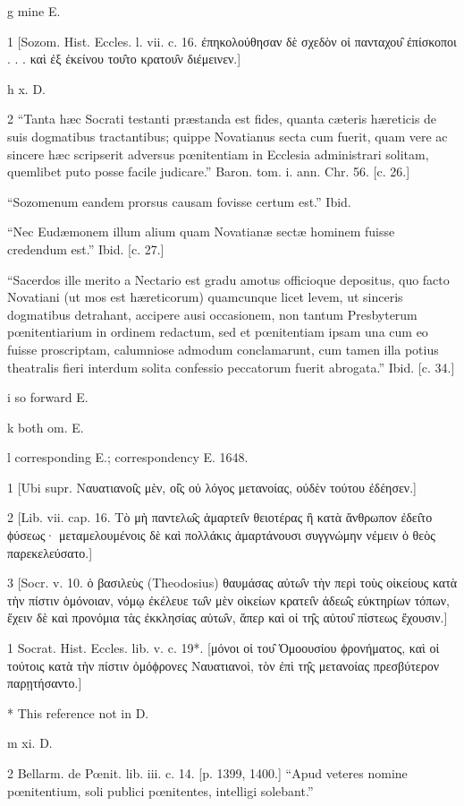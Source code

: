 g
mine E.

1
[Sozom. Hist. Eccles. l. vii. c. 16. ἐπηκολούθησαν δὲ σχεδὸν οἱ πανταχου̑ ἐπίσκοποι . . . καὶ ἐξ ἐκείνου του̑το κρατου̑ν διέμεινεν.]

h
x. D.

2
“Tanta hæc Socrati testanti præstanda est fides, quanta cæteris hæreticis de suis dogmatibus tractantibus; quippe Novatianus secta cum fuerit, quam vere ac sincere hæc scripserit adversus pœnitentiam in Ecclesia administrari solitam, quemlibet puto posse facile judicare.” Baron. tom. i. ann. Chr. 56. [c. 26.]

“Sozomenum eandem prorsus causam fovisse certum est.” Ibid.

“Nec Eudæmonem illum alium quam Novatianæ sectæ hominem fuisse credendum est.” Ibid. [c. 27.]

“Sacerdos ille merito a Nectario est gradu amotus officioque depositus, quo facto Novatiani (ut mos est hæreticorum) quamcunque licet levem, ut sinceris dogmatibus detrahant, accipere ausi occasionem, non tantum Presbyterum pœnitentiarium in ordinem redactum, sed et pœnitentiam ipsam una cum eo fuisse proscriptam, calumniose admodum conclamarunt, cum tamen illa potius theatralis fieri interdum solita confessio peccatorum fuerit abrogata.” Ibid. [c. 34.]

i
so forward E.

k
both om. E.

l
corresponding E.; correspondency E. 1648.

1
[Ubi supr. Ναυατιανοι̑ς μὲν, οἱ̑ς οὐ λόγος μετανοίας, οὐδὲν τούτου ἐδέησεν.]

2
[Lib. vii. cap. 16. Τὸ μὴ παντελω̑ς ἁμαρτει̑ν θειοτέρας ἢ κατὰ ἄνθρωπον ἐδει̑το ϕύσεως· μεταμελουμένοις δὲ καὶ πολλάκις ἁμαρτάνουσι συγγνώμην νέμειν ὁ θεὸς παρεκελεύσατο.]

3
[Socr. v. 10. ὁ βασιλεὺς (Theodosius) θαυμάσας αὐτω̑ν τὴν περὶ τοὺς οἰκείους κατὰ τὴν πίστιν ὁμόνοιαν, νόμῳ ἐκέλευε τω̑ν μὲν οἰκείων κρατει̑ν ἀδεω̑ς εὐκτηρίων τόπων, ἔχειν δὲ καὶ προνόμια τὰς ἐκκλησίας αὐτω̑ν, ἅπερ καὶ οἱ τη̑ς αὐτου̑ πίστεως ἔχουσιν.]

1
Socrat. Hist. Eccles. lib. v. c. 19*. [μόνοι οἱ του̑ Ὁμοουσίου ϕρονήματος, καὶ οἱ τούτοις κατὰ τὴν πίστιν ὁμόϕρονες Ναυατιανοὶ, τὸν ἐπὶ τη̑ς μετανοίας πρεσβύτερον παρῃτήσαντο.]

*
This reference not in D.

m
xi. D.

2
Bellarm. de Pœnit. lib. iii. c. 14. [p. 1399, 1400.] “Apud veteres nomine pœnitentium, soli publici pœnitentes, intelligi solebant.”

